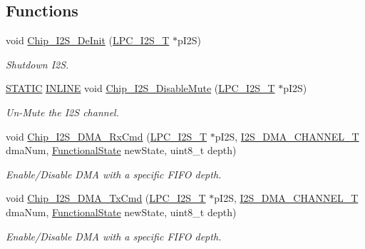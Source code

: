 \subsection*{Functions}
\begin{DoxyCompactItemize}
\item 
void \hyperlink{group__I2S__17XX__40XX_ga2fbdb14520735214e155253f05a88a0a}{Chip\+\_\+\+I2\+S\+\_\+\+De\+Init} (\hyperlink{structLPC__I2S__T}{L\+P\+C\+\_\+\+I2\+S\+\_\+T} $\ast$p\+I2S)
\begin{DoxyCompactList}\small\item\em Shutdown I2S. \end{DoxyCompactList}\item 
\hyperlink{group__LPC__Types__Public__Macros_ga10b2d890d871e1489bb02b7e70d9bdfb}{S\+T\+A\+T\+IC} \hyperlink{group__LPC__Types__Public__Types_ga2eb6f9e0395b47b8d5e3eeae4fe0c116}{I\+N\+L\+I\+NE} void \hyperlink{group__I2S__17XX__40XX_ga0c6731695f685fa21678ea3635b458f3}{Chip\+\_\+\+I2\+S\+\_\+\+Disable\+Mute} (\hyperlink{structLPC__I2S__T}{L\+P\+C\+\_\+\+I2\+S\+\_\+T} $\ast$p\+I2S)
\begin{DoxyCompactList}\small\item\em Un-\/\+Mute the I2S channel. \end{DoxyCompactList}\item 
void \hyperlink{group__I2S__17XX__40XX_ga9c7067a9ee62d240aa6cd9426deefb13}{Chip\+\_\+\+I2\+S\+\_\+\+D\+M\+A\+\_\+\+Rx\+Cmd} (\hyperlink{structLPC__I2S__T}{L\+P\+C\+\_\+\+I2\+S\+\_\+T} $\ast$p\+I2S, \hyperlink{group__I2S__17XX__40XX_gac04c1583101ddd661886d9677683421b}{I2\+S\+\_\+\+D\+M\+A\+\_\+\+C\+H\+A\+N\+N\+E\+L\+\_\+T} dma\+Num, \hyperlink{group__LPC__Types__Public__Types_gac9a7e9a35d2513ec15c3b537aaa4fba1}{Functional\+State} new\+State, uint8\+\_\+t depth)
\begin{DoxyCompactList}\small\item\em Enable/\+Disable D\+MA with a specific F\+I\+FO depth. \end{DoxyCompactList}\item 
void \hyperlink{group__I2S__17XX__40XX_gac08890ba38fd8e5df3a3a603e7a4fa42}{Chip\+\_\+\+I2\+S\+\_\+\+D\+M\+A\+\_\+\+Tx\+Cmd} (\hyperlink{structLPC__I2S__T}{L\+P\+C\+\_\+\+I2\+S\+\_\+T} $\ast$p\+I2S, \hyperlink{group__I2S__17XX__40XX_gac04c1583101ddd661886d9677683421b}{I2\+S\+\_\+\+D\+M\+A\+\_\+\+C\+H\+A\+N\+N\+E\+L\+\_\+T} dma\+Num, \hyperlink{group__LPC__Types__Public__Types_gac9a7e9a35d2513ec15c3b537aaa4fba1}{Functional\+State} new\+State, uint8\+\_\+t depth)
\begin{DoxyCompactList}\small\item\em Enable/\+Disable D\+MA with a specific F\+I\+FO depth. \end{DoxyCompactList}\item 

\end{DoxyCompactItemize}

